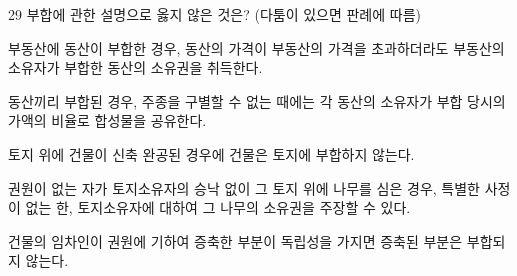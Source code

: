 \begin{question}{29}
부합에 관한 설명으로 옳지 않은 것은? (다툼이 있으면 판례에 따름)
\begin{choices}
  \item 부동산에 동산이 부합한 경우, 동산의 가격이 부동산의 가격을 초과하더라도 부동산의 소유자가 부합한 동산의 소유권을 취득한다.
  \item 동산끼리 부합된 경우, 주종을 구별할 수 없는 때에는 각 동산의 소유자가 부합 당시의 가액의 비율로 합성물을 공유한다.
  \item 토지 위에 건물이 신축 완공된 경우에 건물은 토지에 부합하지 않는다.
  \item 권원이 없는 자가 토지소유자의 승낙 없이 그 토지 위에 나무를 심은 경우, 특별한 사정이 없는 한, 토지소유자에 대하여 그 나무의 소유권을 주장할 수 있다.
  \item 건물의 임차인이 권원에 기하여 증축한 부분이 독립성을 가지면 증축된 부분은 부합되지 않는다.
\end{choices}
\end{question}
